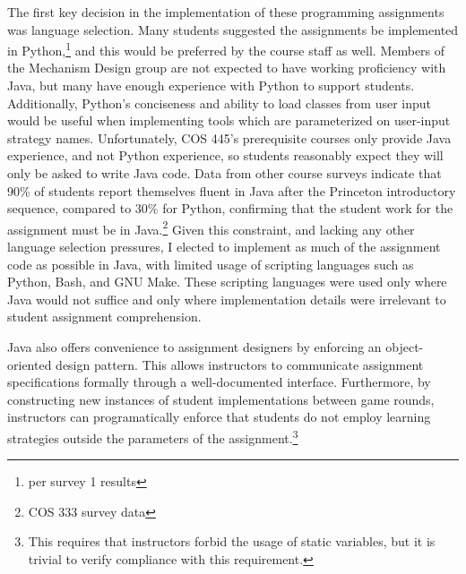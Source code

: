 \documentclass[pageno]{jpaper}
\begin{document}
The first key decision in the implementation of these programming assignments was language selection.
Many students suggested the assignments be implemented in Python,\footnote{per survey 1 results} and this would be preferred by the course staff as well.
Members of the Mechanism Design group are not expected to have working proficiency with Java, but many have enough experience with Python to support students.
Additionally, Python's conciseness and ability to load classes from user input would be useful when implementing tools which are parameterized on user-input strategy names.
Unfortunately, COS 445's prerequisite courses only provide Java experience, and not Python experience, so students reasonably expect they will only be asked to write Java code.
Data from other course surveys indicate that 90\% of students report themselves fluent in Java after the Princeton introductory sequence, compared to 30\% for Python, confirming that the student work for the assignment must be in Java.\footnote{COS 333 survey data}
Given this constraint, and lacking any other language selection pressures, I elected to implement as much of the assignment code as possible in Java, with limited usage of scripting languages such as Python, Bash, and GNU Make.
These scripting languages were used only where Java would not suffice and only where implementation details were irrelevant to student assignment comprehension.

Java also offers convenience to assignment designers by enforcing an object-oriented design pattern.
This allows instructors to communicate assignment specifications formally through a well-documented interface.
Furthermore, by constructing new instances of student implementations between game rounds, instructors can programatically enforce that students do not employ learning strategies outside the parameters of the assignment.\footnote{This requires that instructors forbid the usage of static variables, but it is trivial to verify compliance with this requirement.}
\end{document}
